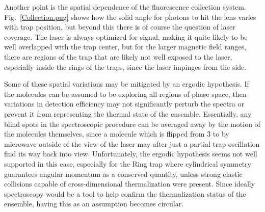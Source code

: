 
Another point is the spatial dependence of the fluorescence collection system.
Fig.~\ref{Collection.png} shows how the solid angle for photons to hit the lens varies with trap position, but beyond this there is of course the question of laser coverage.
The laser is always optimized for signal, making it quite likely to be well overlapped with the trap center, but for the larger magnetic field ranges, there are regions of the trap that are likely not well exposed to the laser, especially inside the rings of the traps, since the laser impinges from the side.


Some of these spatial variations may be mitigated by an ergodic hypothesis.
If the molecules can be assumed to be exploring all regions of phase space, then variations in detection efficiency may not significantly perturb the spectra or prevent it from representing the thermal state of the ensemble.
Essentially, any blind spots in the spectroscopic procedure can be averaged away by the motion of the molecules themselves, since a molecule which is flipped from \f3 to  by microwave outside of the view of the laser may after just a partial trap oscillation find its way back into view.
Unfortunately, the ergodic hypothesis seems not well supported in this case, especially for the Ring trap where cylindrical symmetry guarantees angular momentum as a conserved quantity, unless strong elastic collisions capable of cross-dimensional thermalization were present.
Since ideally spectroscopy would be a tool to help confirm the thermalization status of the ensemble, having this as an assumption becomes circular.

